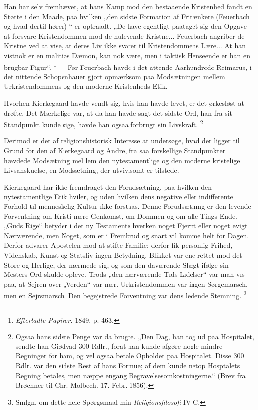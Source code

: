 \documentclass[12pt,a4paper,openany]{book}
\newcommand{\opage}[1]{\marginnote{\footnotesize\textit{[#1]}}}
\begin{document}
Han har selv fremhævet, at hans Kamp mod den bestaaende Kristenhed fandt en
Støtte i den Maade, paa hvilken „den sidste Formation af Fritænkere (Feuerbach
og hvad dertil hører) “ er optraadt. „De have egentligt paataget sig den Opgave
at forsvare Kristendommen mod de nulevende Kristne... Feuerbach angriber de
Kristne ved at vise, at deres Liv ikke svarer til Kristendommens Lære... At han
vistnok er en malitiøs Dæmon, kan nok være, men i taktisk Henseende er han en
brugbar Figur“.%
\footnote[1]{\textit{Efterladte Papirer.} 1849. p. 463.} --- Før Feuerbach
havde i det attende Aarhundrede Reimarus, i det nittende Schopenhauer gjort
opmærksom paa Modsætningen mellem Urkristendommens og den moderne Kristenheds Etik.

Hvorhen Kierkegaard havde vendt sig, hvis han havde levet, er det ørkesløst at
drøfte. Det Mærkelige var, at da han havde sagt det sidste Ord, han fra sit
Standpunkt kunde sige, havde han ogsaa forbrugt sin Livskraft.%
\footnote[2]{Ogsaa hans sidste Penge var da brugte. „Den Dag, han tog ud paa
Hospitalet, sendte han Giødvad 300 Rdlr., forat han kunde afgøre nogle mindre
Regninger for ham, og vel ogsaa betale Opholdet paa Hospitalet. Disse 300 Rdlr.
var den sidste Rest af hans Formue; af dem kunde netop Hosptalets Regning
betales, men næppe engang Begravelsesomkostningerne.“ (Brev fra Brøchner til
Chr. Molbech. 17. Febr. 1856).}

Derimod er det af religionshistorisk Interesse at undersøge, hvad der ligger
til Grund for den af Kierkegaard og Andre, fra saa forskellige Standpunkter
hævdede Modsætning mel%
\setcounter{footnote}{0}%
\opage{172}lem den nytestamentlige og den moderne kristelige Livsanskuelse, en
Modsætning, der utvivlsomt er tilstede.

Kierkegaard har ikke fremdraget den Forudsætning, paa hvilken den
nytestamentlige Etik hviler, og uden hvilken dens negative eller indifferente
Forhold til menneskelig Kultur ikke forstaas. Denne Forudsætning er den levende
Forventning om Kristi nære Genkomst, om Dommen og om alle Tings Ende. „Guds
Rige“ betyder i det ny Testamente hverken noget Fjernt eller noget evigt
Nærværende, men Noget, som er i Frembrud og snart vil komme helt for Dagen.
Derfor advarer Apostelen mod at stifte Familie; derfor fik personlig Frihed,
Videnskab, Kunst og Statsliv ingen Betydning. Blikket var ene rettet mod det
Store og Herlige, der nærmede sig, og som den daværende Slægt ifølge sin
Mesters Ord skulde opleve. Trods „den nærværende Tids Lidelser“ var man vis
paa, at Sejren over „Verden“ var nær. Urkristendommen var ingen Sørgemarsch,
men en Sejrsmarsch. Den begejstrede Forventning var dens ledende Stemning.%
\footnote[1]{Smlgn. om dette hele Spørgsmaal min \textit{Religionsfilosofi} IV C.}
\end{document}
